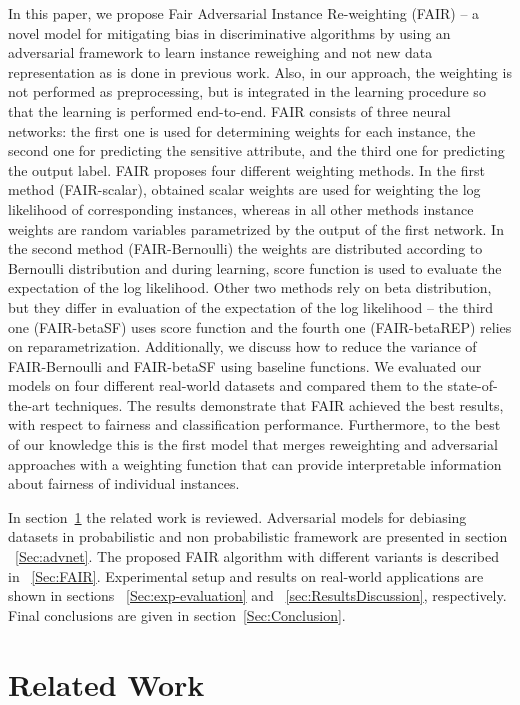 \documentclass[preprint,12pt]{elsarticle}
\begin{document}
In this paper, we propose Fair Adversarial Instance Re-weighting (FAIR) -- a novel model for mitigating bias in discriminative algorithms by using an adversarial framework to learn instance reweighing and not new data representation as is done in previous work. Also, in our approach, the weighting is not performed as preprocessing, but is integrated in the learning procedure so that the learning is performed end-to-end. FAIR consists of three neural networks: the first one is used for determining weights for each instance, the second one for predicting the sensitive attribute, and the third one for predicting the output label. FAIR proposes four different weighting methods. In the first method (FAIR-scalar), obtained scalar weights are used for weighting the log likelihood of corresponding instances, whereas in all other methods instance weights are random variables parametrized by the output of the first network. In the second method (FAIR-Bernoulli) the weights are distributed according to Bernoulli distribution and during learning, score function is used to evaluate the expectation of the log likelihood. Other two methods rely on beta distribution, but they differ in evaluation of the expectation of the log likelihood -- the third one (FAIR-betaSF) uses score function and the fourth one (FAIR-betaREP) relies on reparametrization. Additionally, we discuss how to reduce the variance of FAIR-Bernoulli and FAIR-betaSF using baseline functions. We evaluated our models on four different real-world datasets and compared them to the state-of-the-art techniques. The results demonstrate that FAIR achieved the best results, with respect to fairness and classification performance. Furthermore, to the best of our knowledge this is the first model that merges reweighting and adversarial approaches with a weighting function that can provide interpretable information about fairness of individual instances.

In section~\ref{Sec:Related Work} the related work is reviewed. Adversarial models for debiasing datasets in probabilistic and non probabilistic framework are presented in section ~\ref{Sec:advnet}. The proposed FAIR algorithm with different variants is described in ~\ref{Sec:FAIR}.
Experimental setup and results on real-world applications are shown in sections ~\ref{Sec:exp-evaluation} and ~\ref{sec:ResultsDiscussion}, respectively. Final conclusions are given in section~\ref{Sec:Conclusion}.


\section{Related Work}
\label{Sec:Related Work}
\end{document}
